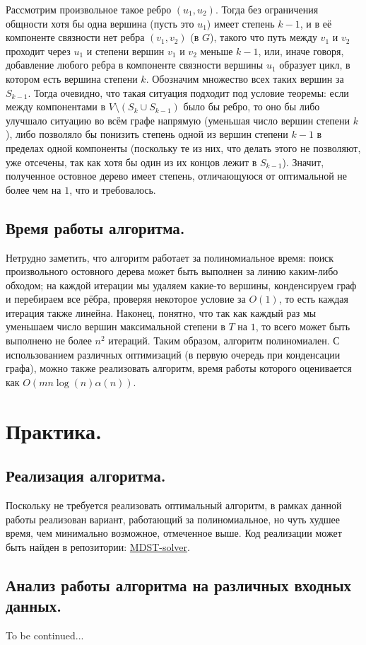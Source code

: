 \documentclass[a4paper,11pt]{article}
\theoremstyle{plain}
\theoremstyle{definition}
\theoremstyle{remark}
\begin{document}
Рассмотрим произвольное такое ребро $(u_1, u_2)$. Тогда без ограничения общности хотя бы одна вершина (пусть это $u_1$) имеет степень $k-1$, и в её компоненте связности нет ребра $(v_1, v_2)$ (в $G$), такого что путь между $v_1$ и $v_2$ проходит через $u_1$ и степени вершин $v_1$ и $v_2$ меньше $k-1$, или, иначе говоря, добавление любого ребра в компоненте связности вершины $u_1$ образует цикл, в котором есть вершина степени $k$. Обозначим множество всех таких вершин за $S_{k-1}$. Тогда очевидно, что такая ситуация подходит под условие теоремы: если между компонентами в $V \setminus (S_k \cup S_{k-1})$ было бы ребро, то оно бы либо улучшало ситуацию во всём графе напрямую (уменьшая число вершин степени $k$), либо позволяло бы понизить степень одной из вершин степени $k-1$ в пределах одной компоненты (поскольку те из них, что делать этого не позволяют, уже отсечены, так как хотя бы один из их концов лежит в $S_{k-1}$). Значит, полученное остовное дерево имеет степень, отличающуюся от оптимальной не более чем на $1$, что и требовалось.

\subsection{Время работы алгоритма.}

Нетрудно заметить, что алгоритм работает за полиномиальное время: поиск произвольного остовного дерева может быть выполнен за линию каким-либо обходом; на каждой итерации мы удаляем какие-то вершины, конденсируем граф и перебираем все рёбра, проверяя некоторое условие за $O(1)$, то есть каждая итерация также линейна. Наконец, понятно, что так как каждый раз мы уменьшаем число вершин максимальной степени в $T$ на $1$, то всего может быть выполнено не более $n^2$ итераций. Таким образом, алгоритм полиномиален. С использованием различных оптимизаций (в первую очередь при конденсации графа), можно также реализовать алгоритм, время работы которого оценивается как $O(mn\log (n) \alpha(n))$.

\section{Практика.}

\subsection{Реализация алгоритма.}

Поскольку не требуется реализовать оптимальный алгоритм, в рамках данной работы реализован вариант, работающий за полиномиальное, но чуть худшее время, чем минимально возможное, отмеченное выше. Код реализации может быть найден в репозитории: \href{https://github.com/notdenied/MDST-solver}{MDST-solver}.

\subsection{Анализ работы алгоритма на различных входных данных.}

To be continued...



\end{document}
